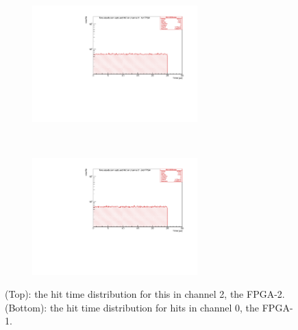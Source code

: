 \begin{figure}[!h]
  \begin{subfigure}[b]{\textwidth}
      \centering
      \includegraphics[width=0.7\textwidth]{figures/pdf/figure_00001_timedistr_roc_simulation_10538.pdf}
      \label{fig:ttt1}
  \end{subfigure}
\\
  \begin{subfigure}[b]{\textwidth}
      \centering
      \includegraphics[width=0.7\textwidth]{figures/pdf/figure_00012_timedistr_roc_simulation_ch2_105038.pdf}
      \label{fig:ttt2}
  \end{subfigure}
     \caption{(Top): the hit time distribution for this in channel 2, the FPGA-2. 
     (Bottom): the hit time distribution for hits in channel 0, the FPGA-1.}
     \label{fig:4}
\end{figure}

